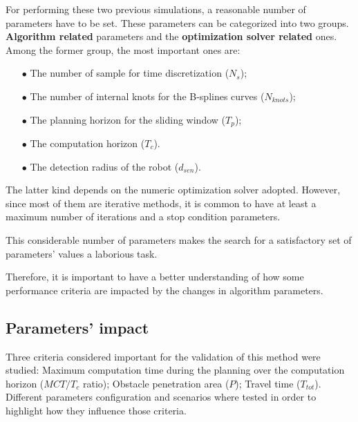 \documentclass[eprint]{actapoly}
\begin{document}
For performing these two previous simulations, a reasonable number of parameters have to be set. These parameters can be categorized into two groups. \textbf{Algorithm related} parameters and the \textbf{optimization solver related} ones.
Among the former group, the most important ones are:
\begin{itemize}
\item[$\bullet$] The number of sample for time discretization ($N_s$);
\item[$\bullet$] The number of internal knots for the B-splines curves ($N_{knots}$);
\item[$\bullet$] The planning horizon for the sliding window ($T_p$);
\item[$\bullet$] The computation horizon ($T_c$).
\item[$\bullet$] The detection radius of the robot ($d_{sen}$).
\end{itemize}

The latter kind depends on the numeric optimization solver adopted.
However, since most of them are iterative methods, it is common
to have at least a maximum number of iterations and a stop condition parameters.


This considerable number of parameters
makes the search for a
satisfactory set of parameters' values a laborious task.

Therefore, it is important to have a better understanding of how some
performance criteria are impacted by the changes in algorithm
parameters.

\subsection{Parameters' impact}

Three criteria considered important for the validation of this method were studied: {Maximum computation time} during the planning over the computation horizon ($MCT/T_c$ 
ratio); Obstacle penetration area ($P$); Travel time ($T_{tot}$).
Different parameters configuration and scenarios where tested in order to highlight
how they influence those criteria.
%
%
%
%
%
\end{document}
